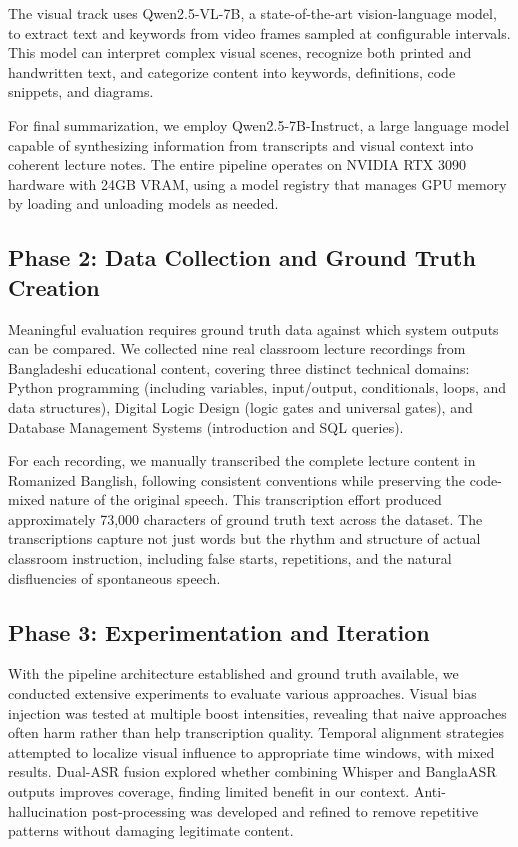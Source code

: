 The visual track uses Qwen2.5-VL-7B, a state-of-the-art vision-language model, to extract text and keywords from video frames sampled at configurable intervals. This model can interpret complex visual scenes, recognize both printed and handwritten text, and categorize content into keywords, definitions, code snippets, and diagrams.

For final summarization, we employ Qwen2.5-7B-Instruct, a large language model capable of synthesizing information from transcripts and visual context into coherent lecture notes. The entire pipeline operates on NVIDIA RTX 3090 hardware with 24GB VRAM, using a model registry that manages GPU memory by loading and unloading models as needed.

\subsection{Phase 2: Data Collection and Ground Truth Creation}

Meaningful evaluation requires ground truth data against which system outputs can be compared. We collected nine real classroom lecture recordings from Bangladeshi educational content, covering three distinct technical domains: Python programming (including variables, input/output, conditionals, loops, and data structures), Digital Logic Design (logic gates and universal gates), and Database Management Systems (introduction and SQL queries).

For each recording, we manually transcribed the complete lecture content in Romanized Banglish, following consistent conventions while preserving the code-mixed nature of the original speech. This transcription effort produced approximately 73,000 characters of ground truth text across the dataset. The transcriptions capture not just words but the rhythm and structure of actual classroom instruction, including false starts, repetitions, and the natural disfluencies of spontaneous speech.

\subsection{Phase 3: Experimentation and Iteration}

With the pipeline architecture established and ground truth available, we conducted extensive experiments to evaluate various approaches. Visual bias injection was tested at multiple boost intensities, revealing that naive approaches often harm rather than help transcription quality. Temporal alignment strategies attempted to localize visual influence to appropriate time windows, with mixed results. Dual-ASR fusion explored whether combining Whisper and BanglaASR outputs improves coverage, finding limited benefit in our context. Anti-hallucination post-processing was developed and refined to remove repetitive patterns without damaging legitimate content.

